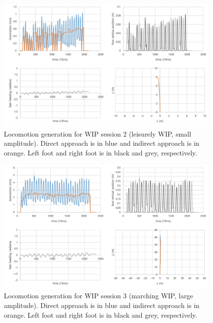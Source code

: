 \begin{figure}[th]
\captionsetup{justification=raggedright,singlelinecheck=false}
\centering
\includegraphics[width=\textwidth,height=\textheight,keepaspectratio]{Figures/session2.jpg}
\decoRule
\caption[WIP session 2]{Locomotion generation for WIP session 2 (leisurely WIP, small amplitude). Direct approach is in blue and indirect approach is in orange. Left foot and right foot is in black and grey, respectively.}
\label{fig:wip_session2}
\end{figure}

\begin{figure}[th]
\captionsetup{justification=raggedright,singlelinecheck=false}
\centering
\includegraphics[width=\textwidth,height=\textheight,keepaspectratio]{Figures/session3.jpg}
\decoRule
\caption[WIP session 3]{Locomotion generation for WIP session 3 (marching WIP, large amplitude). Direct approach is in blue and indirect approach is in orange. Left foot and right foot is in black and grey, respectively.}
\label{fig:wip_session3}
\end{figure}

